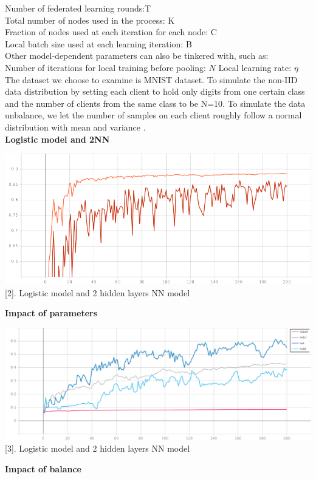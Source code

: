 \documentclass{article}
\theoremstyle{theorem}
\theoremstyle{definition}
\begin{document}
Number of federated learning rounds:T\\
Total number of nodes used in the process: K\\
Fraction of nodes used at each iteration for each node: C\\
Local batch size used at each learning iteration: B\\
Other model-dependent parameters can also be tinkered with, such as:\\
Number of iterations for local training before pooling: $N$
Local learning rate: $\eta $\\
The dataset we choose to examine is MNIST dataset. To simulate the non-IID data distribution
by setting each client to hold only digits from one certain
class and the number of clients from the same class to be
N=10. To simulate the data unbalance, we let the number of
samples on each client roughly follow a normal distribution
with mean  and variance .\\
\textbf{Logistic model and 2NN }
\begin{center}
	\includegraphics[scale=0.4]{2nn-log.png}	
	\figurename[2]{. Logistic model and 2 hidden layers NN model}
\end{center}
\textbf{Impact of parameters}
\begin{center}
		\includegraphics[scale=0.45]{lr.png}
	\figurename[3]{. Logistic model and 2 hidden layers NN model}
\end{center}
\textbf{Impact of balance}
\end{document}
